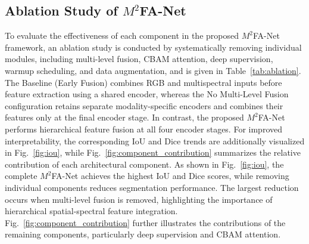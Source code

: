 \documentclass[pdflatex,sn-mathphys-num]{sn-jnl}
\newcommand{\rev}[1]{{\color{revisionblue}#1}}
\begin{document}
\subsection{Ablation Study of
\texorpdfstring{$M^2$FA-Net}{M2FA-Net}}
To evaluate the effectiveness of each component in the proposed $M^2$FA-Net framework, an ablation study is conducted by systematically removing individual modules, including multi-level fusion, CBAM attention, deep supervision, warmup scheduling, and data augmentation, and is given in Table~\ref{tab:ablation}. \rev{The Baseline (Early Fusion) combines RGB and multispectral inputs before feature extraction using a shared encoder, whereas the No Multi-Level Fusion configuration retains separate modality-specific encoders and combines their features only at the final encoder stage. In contrast, the proposed $M^2$FA-Net performs hierarchical feature fusion at all four encoder stages.} For improved interpretability, the corresponding IoU and Dice
trends are additionally visualized in Fig.~\ref{fig:iou}, while
Fig.~\ref{fig:component_contribution} summarizes the relative
contribution of each architectural component.
As shown in Fig.~\ref{fig:iou}, the complete
$M^2$FA-Net achieves the highest IoU and Dice scores,
while removing individual components reduces
segmentation performance. The largest reduction
occurs when multi-level fusion is removed,
highlighting the importance of hierarchical
spatial-spectral feature integration.
Fig.~\ref{fig:component_contribution} further
illustrates the contributions of the remaining
components, particularly deep supervision
and CBAM attention.
\end{document}
